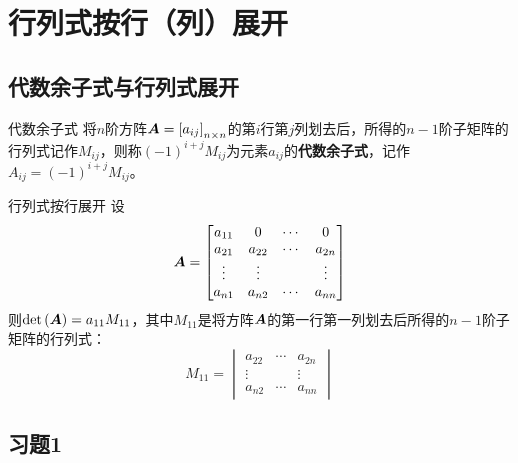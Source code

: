 \documentclass[9pt,xcolor=svgnames]{beamer} %
\begin{document}
\section{行列式按行（列）展开}
\subsection*{代数余子式与行列式展开}
\begin{frame}
    \begin{block}{代数余子式}
        将\(n\)阶方阵\(\boldsymbol{A}=\left[ a_{ij} \right]_{n\times n}\)的第\(i\)行第\(j\)列划去后，所得的\(n-1\)阶子矩阵的行列式记作\(M_{ij}\)，则称\((-1)^{i+j}M_{ij}\)为元素\(a_{ij}\)的\textbf{代数余子式}，记作\(A_{ij}=(-1)^{i+j}M_{ij}\)。
    \end{block}
    \begin{block}{行列式按行展开}
        设
        \begin{equation*}
            \boldsymbol{A}=\begin{bmatrix}
                a_{11} & 0      & \cdots & 0      \\
                a_{21} & a_{22} & \cdots & a_{2n} \\
                \vdots & \vdots &        & \vdots \\
                a_{n1} & a_{n2} & \cdots & a_{nn}
            \end{bmatrix}
        \end{equation*}
        则\(\mathrm{det}\left( \boldsymbol{A} \right)=a_{11}M_{11}\)，其中\(M_{11}\)是将方阵\(\boldsymbol{A}\)的第一行第一列划去后所得的\(n-1\)阶子矩阵的行列式：
        \begin{equation*}
            M_{11}=\begin{vmatrix}
                a_{22} & \cdots & a_{2n} \\
                \vdots &        & \vdots \\
                a_{n2} & \cdots & a_{nn}
            \end{vmatrix}
        \end{equation*}
    \end{block}
\end{frame}

\subsection*{习题1}
\end{document}
